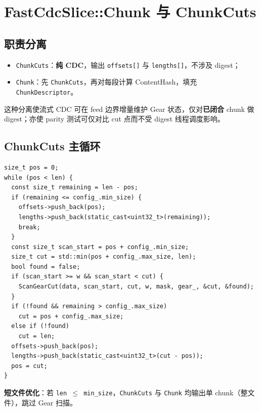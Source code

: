\section{FastCdcSlice::Chunk 与 ChunkCuts}
\label{sec:chunk-vs-cuts}

\subsection{职责分离}

\begin{designbox}
\begin{itemize}[nosep]
  \item \texttt{ChunkCuts}：\textbf{纯 CDC}，输出 \texttt{offsets[]} 与 \texttt{lengths[]}，不涉及 digest；
  \item \texttt{Chunk}：先 \texttt{ChunkCuts}，再对每段计算 ContentHash，填充 \texttt{ChunkDescriptor}。
\end{itemize}
\end{designbox}

这种分离使流式 CDC 可在 feed 边界增量维护 Gear 状态，仅对\textbf{已闭合} chunk 做 digest；亦使 parity 测试可仅对比 cut 点而不受 digest 线程调度影响。

\subsection{ChunkCuts 主循环}

\begin{lstlisting}[caption={ChunkCuts 扫描逻辑（\filepath{fast\_cdc.cc} 摘要）},label={lst:chunk-cuts}]
size_t pos = 0;
while (pos < len) {
  const size_t remaining = len - pos;
  if (remaining <= config_.min_size) {
    offsets->push_back(pos);
    lengths->push_back(static_cast<uint32_t>(remaining));
    break;
  }
  const size_t scan_start = pos + config_.min_size;
  size_t cut = std::min(pos + config_.max_size, len);
  bool found = false;
  if (scan_start >= w && scan_start < cut) {
    ScanGearCut(data, scan_start, cut, w, mask, gear_, &cut, &found);
  }
  if (!found && remaining > config_.max_size)
    cut = pos + config_.max_size;
  else if (!found)
    cut = len;
  offsets->push_back(pos);
  lengths->push_back(static_cast<uint32_t>(cut - pos));
  pos = cut;
}
\end{lstlisting}

\textbf{短文件优化}：若 \texttt{len $\leq$ min\_size}，\texttt{ChunkCuts} 与 \texttt{Chunk} 均输出单 chunk（整文件），跳过 Gear 扫描。

